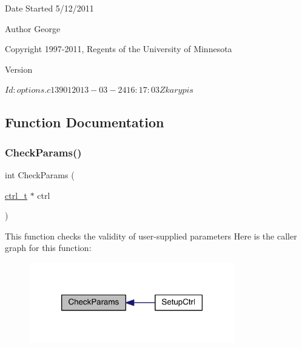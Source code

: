 \begin{DoxyDate}{Date}
Started 5/12/2011 
\end{DoxyDate}
\begin{DoxyAuthor}{Author}
George 

Copyright 1997-\/2011, Regents of the University of Minnesota 
\end{DoxyAuthor}
\begin{DoxyVersion}{Version}
\begin{DoxyVerb}$Id: options.c 13901 2013-03-24 16:17:03Z karypis $ \end{DoxyVerb}
 
\end{DoxyVersion}


\subsection{Function Documentation}
\mbox{\label{a00254_a279ffe27d8412909f9117b5ca4721dce}} 
\subsubsection{\texorpdfstring{Check\+Params()}{CheckParams()}}
{\footnotesize\ttfamily int Check\+Params (\begin{DoxyParamCaption}\item[{\hyperlink{a00742}{ctrl\+\_\+t} $\ast$}]{ctrl }\end{DoxyParamCaption})}

This function checks the validity of user-\/supplied parameters Here is the caller graph for this function\+:\nopagebreak
\begin{figure}[H]
\begin{center}
\leavevmode
\includegraphics[width=254pt]{a00254_a279ffe27d8412909f9117b5ca4721dce_icgraph}
\end{center}
\end{figure}
\mbox{\label{a00254_ab44b3384fa925eae532b7bcc825159d7}} 
